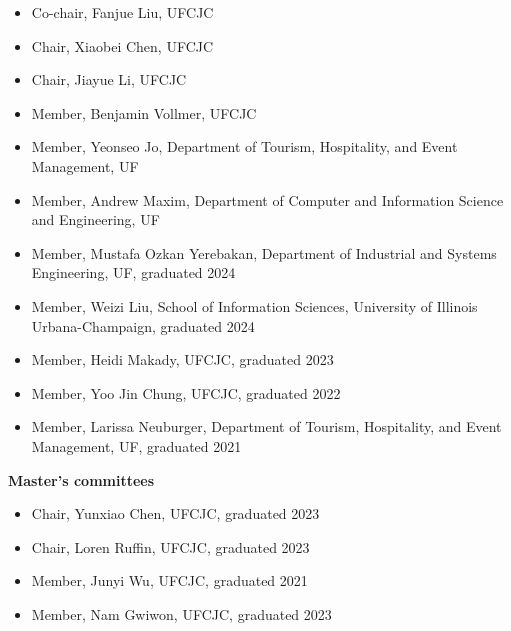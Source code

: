 \documentclass[]{article}
\providecommand{\tightlist}{%
  \setlength{\itemsep}{0pt}\setlength{\parskip}{0pt}}
\begin{document}
\begin{itemize}
\tightlist
\item
  Co-chair, Fanjue Liu, UFCJC
\item
  Chair, Xiaobei Chen, UFCJC
\item
  Chair, Jiayue Li, UFCJC
\item
  Member, Benjamin Vollmer, UFCJC
\item
  Member, Yeonseo Jo, Department of Tourism, Hospitality, and Event
  Management, UF
\item
  Member, Andrew Maxim, Department of Computer and Information Science
  and Engineering, UF
\item
  Member, Mustafa Ozkan Yerebakan, Department of Industrial and Systems
  Engineering, UF, graduated 2024
\item
  Member, Weizi Liu, School of Information Sciences, University of
  Illinois Urbana-Champaign, graduated 2024
\item
  Member, Heidi Makady, UFCJC, graduated 2023
\item
  Member, Yoo Jin Chung, UFCJC, graduated 2022
\item
  Member, Larissa Neuburger, Department of Tourism, Hospitality, and
  Event Management, UF, graduated 2021
\end{itemize}

\textbf{Master's committees}

\begin{itemize}
\tightlist
\item
  Chair, Yunxiao Chen, UFCJC, graduated 2023
\item
  Chair, Loren Ruffin, UFCJC, graduated 2023
\item
  Member, Junyi Wu, UFCJC, graduated 2021
\item
  Member, Nam Gwiwon, UFCJC, graduated 2023
\end{itemize}
\end{document}
